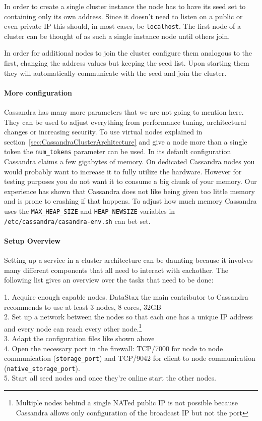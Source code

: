 In order to create a single cluster instance the node has to have its seed set to containing only its own address. Since it doesn't need to listen on a public or even private IP this should, in most cases, be \texttt{localhost}.
The first node of a cluster can be thought of as such a single instance node until others join.

In order for additional nodes to join the cluster configure them analogous to the first, changing the address values but keeping the seed list.
Upon starting them they will automatically communicate with the seed and join the cluster.

\paragraph{More configuration} Cassandra has many more parameters that we are not going to mention here. They can be used to adjust everything from performance tuning, architectural changes or increasing security.
To use virtual nodes explained in section~\ref{sec:CassandraClusterArchitecture} and give a node more than a single token the \texttt{num\_tokens} parameter can be used. \autocite{cassandra_config}
In its default configuration Cassandra claims a few gigabytes of memory. On dedicated Cassandra nodes you would probably want to increase it to fully utilize the hardware. However for testing purposes you do not want it to consume a big chunk of your memory. Our experience has shown that Cassandra does not like being given too little memory and is prone to crashing if that happens. To adjust how much memory Cassandra uses the \texttt{MAX\_HEAP\_SIZE} and \texttt{HEAP\_NEWSIZE} variables in \texttt{/etc/cassandra/casandra-env.sh} can bet set. \autocite[281]{cassandra_oreilly}

\paragraph{Setup Overview} Setting up a service in a cluster architecture can be daunting because it involves many different components that all need to interact with eachother. The following list gives an overview over the tasks that need to be done:

1. Acquire enough capable nodes. DataStax the main contributor to Cassandra recommends to use at least 3 nodes, 8 cores, 32GB \\  %
2. Set up a network between the nodes so that each one has a unique IP address and every node can reach every other node.\footnote{Multiple nodes behind a single NATed public IP is not possible because Cassandra allows only configuration of the broadcast IP but not the port} \\
3. Adapt the configuration files like shown above \\
4. Open the necessary port in the firewall: TCP/7000 for node to node communication (\texttt{storage\_port}) and TCP/9042 for client to node communication (\texttt{native\_storage\_port}). \\
5. Start all seed nodes and once they're online start the other nodes. \\

